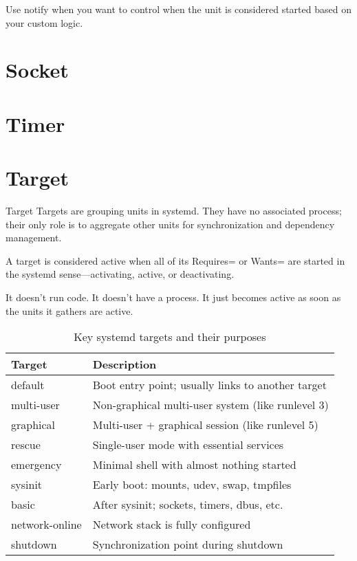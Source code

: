 \documentclass[openany, 12pt]{book}
\begin{document}
Use notify when you want to control when the unit is considered started based on
your custom logic.

\section{Socket}

\section{Timer}

\section{Target}
\begin{definition}{Target}{}
	Targets are grouping units in systemd. They have no associated process;
	their only role is to aggregate other units for synchronization and
	dependency management.
\end{definition}

A target is considered active when all of its Requires= or Wants= are started
in the systemd sense---activating, active, or deactivating.

It doesn’t run code. It doesn't have a process. It just becomes active as soon
as the units it gathers are active.

\begin{table}[h]
	\centering
	\begin{tabular}{ll}
		\toprule
		\textbf{Target} & \textbf{Description}                              \\
		\midrule
		default         & Boot entry point; usually links to another target \\
		multi-user      & Non-graphical multi-user system (like runlevel 3) \\
		graphical       & Multi-user + graphical session (like runlevel 5)  \\
		rescue          & Single-user mode with essential services          \\
		emergency       & Minimal shell with almost nothing started         \\
		sysinit         & Early boot: mounts, udev, swap, tmpfiles          \\
		basic           & After sysinit; sockets, timers, dbus, etc.        \\
		network-online  & Network stack is fully configured                 \\
		shutdown        & Synchronization point during shutdown             \\
		\bottomrule
	\end{tabular}
	\caption{Key systemd targets and their purposes}
\end{table}
\end{document}
